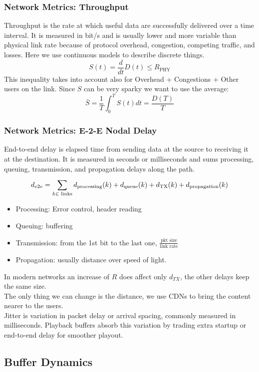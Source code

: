 \subsubsection{Network Metrics: Throughput}
Throughput is the rate at which useful data are successfully delivered over a time interval. It is measured in bit/s and is usually lower and more variable than physical link rate because of protocol overhead, congestion, competing traffic, and losses.
Here we use continuous models to describe discrete things.
$$S(t) = \frac{d}{dt}D(t) \leq R_{\text{PHY}}$$
This inequality takes into account also for Overhead + Congestions + Other users on the link.
Since $S$ can be very sparky we want to use the average:
$$\bar{S} = \frac{1}{T}\int_0^TS(t)dt = \frac{D(T)}{T}$$
\subsubsection{Network Metrics: E-2-E Nodal Delay}
End-to-end delay is elapsed time from sending data at the source to receiving it at the destination. It is measured in seconds or milliseconds and sums processing, queuing, transmission, and propagation delays along the path.
$$d_{e2e} = \sum_{k \in \text{ links}}^{}d_{\text{processing}}(k) + d_{\text{queue}}(k) + d_{\text{TX}}(k) + d_{\text{propagation}}(k)$$
\begin{itemize}
    \item Processing: Error control, header reading
    \item Queuing: buffering
    \item Transmission: from the 1st bit to the last one, $\frac{\text{pkt size}}{\text{link rate}}$
    \item Propagation: usually distance over speed of light.
\end{itemize}
In modern networks an increase of $R$ does affect only $d_{TX}$, the other delays keep the same size.\\
The only thing we can change is the distance, we use CDNs to bring the content nearer to the users.\\
Jitter is variation in packet delay or arrival spacing, commonly measured in milliseconds. Playback buffers absorb this variation by trading extra startup or end-to-end delay for smoother playout.
\subsection{Buffer Dynamics}
